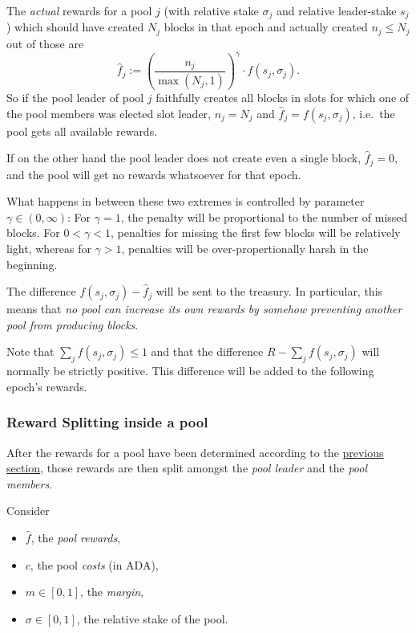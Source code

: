 \documentclass[11pt,a4paper]{article}
\begin{document}
The \emph{actual} rewards for a pool \(j\) (with relative stake
\(\sigma_j\) and relative leader-stake \(s_j\)) which should have
created \(N_j\) blocks in that epoch and actually created
\(n_j\leq N_j\) out of those are \[
    \hat{f}_j := \left(\frac{n_j}{\max(N_j, 1)}\right)^\gamma\cdot f(s_j,\sigma_j).
\] So if the pool leader of pool \(j\) faithfully creates all blocks in
slots for which one of the pool members was elected slot leader,
\(n_j=N_j\) and \(\hat{f}_j=f(s_j,\sigma_j)\), i.e.~the pool gets all
available rewards.

If on the other hand the pool leader does not create even a single
block, \(\hat{f}_j=0\), and the pool will get no rewards whatsoever for
that epoch.

What happens in between these two extremes is controlled by parameter
\(\gamma\in(0,\infty)\): For \(\gamma=1\), the penalty will be
proportional to the number of missed blocks. For \(0<\gamma<1\),
penalties for missing the first few blocks will be relatively light,
whereas for \(\gamma>1\), penalties will be over-propertionally harsh in
the beginning.

The difference \(f(s_j,\sigma_j)-\hat{f}_j\) will be sent to the
treasury. In particular, this means that \emph{no pool can increase its
own rewards by somehow preventing another pool from producing blocks}.

Note that \(\sum_jf(s_j,\sigma_j)\leq 1\) and that the difference
\(R-\sum_jf(s_j,\sigma_j)\) will normally be strictly positive. This
difference will be added to the following epoch's rewards.

\subsubsection{Reward Splitting inside a pool}
\label{reward-splitting-inside-a-pool}

After the rewards for a pool have been determined according to the
\hyperref[pool-rewards]{previous section}, those rewards are then split
amongst the \emph{pool leader} and the \emph{pool members}.

Consider

\begin{itemize}
\item
  \(\hat{f}\), the \emph{pool rewards},
\item
  \(c\), the pool \emph{costs} (in ADA),
\item
  \(m\in[0,1]\), the \emph{margin},
\item
  \(\sigma\in[0,1]\), the relative stake of the pool.
\end{itemize}
\end{document}

